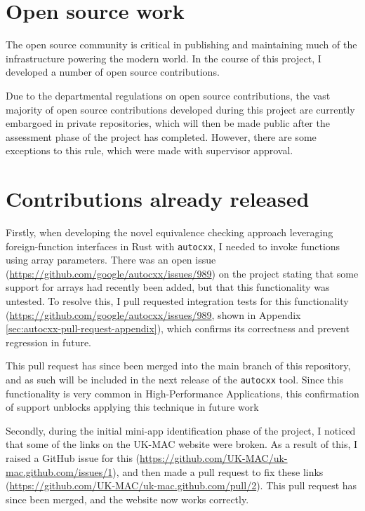 \section{Open source work}
\label{sec:open-source-work}

The open source community is critical in publishing and maintaining much of the infrastructure powering the modern world. In the course of this project, I developed a number of open source contributions.

Due to the departmental regulations on open source contributions, the vast majority of open source contributions developed during this project are currently embargoed in private repositories, which will then be made public after the assessment phase of the project has completed. However, there are some exceptions to this rule, which were made with supervisor approval.

\section{Contributions already released}
\label{ssec:open-source-already-released}

Firstly, when developing the novel equivalence checking approach leveraging foreign-function interfaces in Rust with \texttt{autocxx}, I needed to invoke functions using array parameters. There was an open issue (\url{https://github.com/google/autocxx/issues/989}) on the project stating that some support for arrays had recently been added, but that this functionality was untested. To resolve this, I pull requested integration tests for this functionality (\url{https://github.com/google/autocxx/issues/989}, shown in Appendix \ref{sec:autocxx-pull-request-appendix}), which confirms its correctness and prevent regression in future.

This pull request has since been merged into the main branch of this repository, and as such will be included in the next release of the \texttt{autocxx} tool. Since this functionality is very common in High-Performance Applications, this confirmation of support unblocks applying this technique in future work

Secondly, during the initial mini-app identification phase of the project, I noticed that some of the links on the UK-MAC website were broken. As a result of this, I raised a GitHub issue for this (\url{https://github.com/UK-MAC/uk-mac.github.com/issues/1}), and then made a pull request to fix these links (\url{https://github.com/UK-MAC/uk-mac.github.com/pull/2}). This pull request has since been merged, and the website now works correctly.

